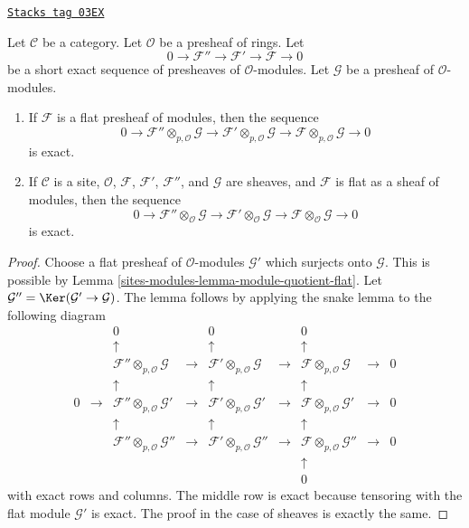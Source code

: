 \begin{lemma}
\label{sites-modules-lemma-flat-tor-zero}
\href{https://stacks.math.columbia.edu/tag/03EX}{\texttt{Stacks tag 03EX}}

Let $\mathcal{C}$ be a category.
Let $\mathcal{O}$ be a presheaf of rings.
Let
$$
0 \to \mathcal{F}'' \to \mathcal{F}' \to \mathcal{F} \to 0
$$
be a short exact sequence of presheaves of $\mathcal{O}$-modules.
Let $\mathcal{G}$ be a presheaf of $\mathcal{O}$-modules.
\begin{enumerate}
\item If $\mathcal{F}$ is a flat presheaf of modules, then
the sequence
$$
0 \to
\mathcal{F}'' \otimes_{p, \mathcal{O}} \mathcal{G} \to
\mathcal{F}' \otimes_{p, \mathcal{O}} \mathcal{G} \to
\mathcal{F} \otimes_{p, \mathcal{O}} \mathcal{G} \to 0
$$
is exact.
\item If $\mathcal{C}$ is a site, $\mathcal{O}$,
$\mathcal{F}$, $\mathcal{F}'$, $\mathcal{F}''$, and
$\mathcal{G}$ are sheaves, and $\mathcal{F}$ is flat
as a sheaf of modules, then the sequence
$$
0 \to
\mathcal{F}'' \otimes_\mathcal{O} \mathcal{G} \to
\mathcal{F}' \otimes_\mathcal{O} \mathcal{G} \to
\mathcal{F} \otimes_\mathcal{O} \mathcal{G} \to 0
$$
is exact.
\end{enumerate}
\end{lemma}

\begin{proof}
Choose a flat presheaf of $\mathcal{O}$-modules $\mathcal{G}'$
which surjects onto $\mathcal{G}$. This is possible by
Lemma \ref{sites-modules-lemma-module-quotient-flat}. Let
$\mathcal{G}'' = \Ker(\mathcal{G}' \to \mathcal{G})$.
The lemma follows by applying the snake lemma to the following
diagram
$$
\begin{matrix}
 & & 0 & & 0 & & 0 & & \\
 & & \uparrow & & \uparrow & & \uparrow & & \\
 & & \mathcal{F}'' \otimes_{p, \mathcal{O}} \mathcal{G} & \to &
     \mathcal{F}' \otimes_{p, \mathcal{O}} \mathcal{G} & \to &
     \mathcal{F} \otimes_{p, \mathcal{O}} \mathcal{G} & \to & 0 \\
 & & \uparrow & & \uparrow & & \uparrow & & \\
0 & \to & \mathcal{F}'' \otimes_{p, \mathcal{O}} \mathcal{G}' & \to &
          \mathcal{F}' \otimes_{p, \mathcal{O}} \mathcal{G}' & \to &
          \mathcal{F} \otimes_{p, \mathcal{O}} \mathcal{G}' & \to & 0 \\
 & & \uparrow & & \uparrow & & \uparrow & & \\
 & & \mathcal{F}'' \otimes_{p, \mathcal{O}} \mathcal{G}'' & \to &
     \mathcal{F}' \otimes_{p, \mathcal{O}} \mathcal{G}'' & \to &
     \mathcal{F} \otimes_{p, \mathcal{O}} \mathcal{G}'' & \to & 0 \\
 & & & & & & \uparrow & & \\
 & & & & & & 0 & &
\end{matrix}
$$
with exact rows and columns. The middle row is exact because tensoring
with the flat module $\mathcal{G}'$ is exact. The proof in the case
of sheaves is exactly the same.
\end{proof}

